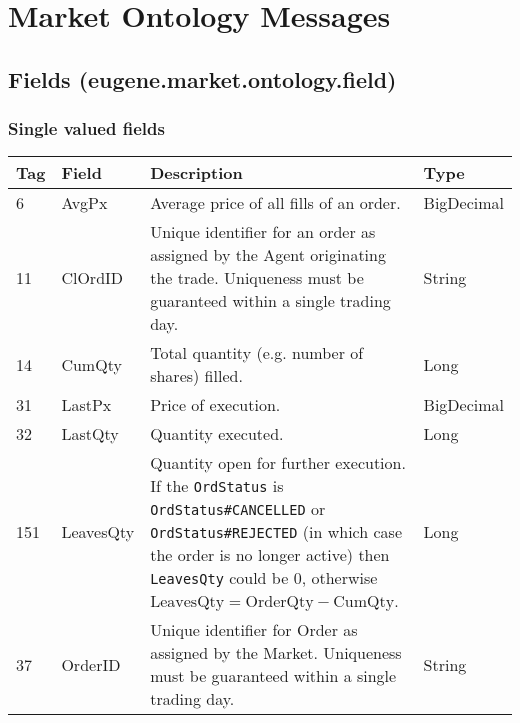 \chapter{Market Ontology Messages}
\label{Appendix/Market-Ontology}

\section{Fields (eugene.market.ontology.field)}

\FloatBarrier
\subsection{Single valued fields}

\begin{table}[htbp]
\begin{center}
\begin{tabular}{l l p{3.5in} l}

\multicolumn{1}{l}{\textbf{Tag}}            &
\multicolumn{1}{l}{\textbf{Field}}  	    &
\multicolumn{1}{l}{\textbf{Description}}    & 
\multicolumn{1}{l}{\textbf{Type}}		   	\\              
\toprule

6  	& AvgPx  	& Average price of all fills of an order. & BigDecimal \\

11 	& ClOrdID	& Unique identifier for an order as assigned by the Agent originating the trade. Uniqueness must be guaranteed within a single trading day. & String \\

14	& CumQty	& Total quantity (e.g. number of shares) filled. & Long \\

31  & LastPx	& Price of execution.	& BigDecimal \\

32  & LastQty	& Quantity executed.	& Long	     \\

151	& LeavesQty	& Quantity open for further execution. If the \texttt{OrdStatus} is \texttt{OrdStatus\#CANCELLED} or \texttt{OrdStatus\#REJECTED} (in which case the order is no longer active) then \texttt{LeavesQty} could be $0$, otherwise $\mbox{LeavesQty} = \mbox{OrderQty} - \mbox{CumQty}$. & Long \\

37	& OrderID	& Unique identifier for Order as assigned by the Market. Uniqueness must be guaranteed within a single trading day.  & String \\


\end{tabular}
\end{center}
\end{table}
